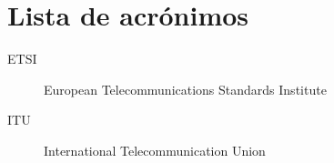 \chapter{Lista de acrónimos}

\begin{description}
	\item [ETSI] European Telecommunications Standards Institute
	\item [ITU] International Telecommunication Union
\end{description}